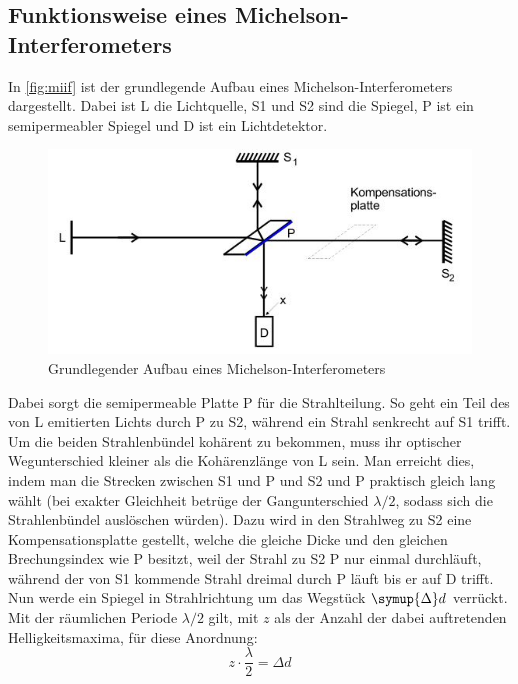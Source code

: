 \subsection{Funktionsweise eines Michelson-Interferometers} 
In \autoref{fig:miif} ist der grundlegende Aufbau eines Michelson-Interferometers dargestellt. Dabei ist L die Lichtquelle, S1 und S2 sind die Spiegel, P ist ein semipermeabler Spiegel und D ist ein Lichtdetektor. 
\begin{figure}[H]
    \centering
    \includegraphics[width=\textwidth]{graphics/miif.JPG}
    \caption{Grundlegender Aufbau eines Michelson-Interferometers \cite{anleitung}}
    \label{fig:miif}
    \end{figure}
    \noindent
Dabei sorgt die semipermeable Platte P für die Strahlteilung. So geht ein Teil des von L emitierten Lichts durch P zu S2, während ein Strahl senkrecht auf S1 trifft. Um die beiden Strahlenbündel kohärent zu bekommen, muss ihr optischer Wegunterschied kleiner als die Kohärenzlänge von L sein. Man erreicht dies, indem man die Strecken zwischen S1 und P und S2 und P praktisch gleich lang wählt (bei exakter Gleichheit betrüge der Gangunterschied $\lambda/2$, sodass sich die Strahlenbündel auslöschen würden). Dazu wird in den Strahlweg zu S2 eine Kompensationsplatte gestellt, welche die gleiche Dicke und den gleichen Brechungsindex wie P besitzt, weil der Strahl zu S2 P nur einmal durchläuft, während der von S1 kommende Strahl dreimal durch P läuft bis er auf D trifft.
Nun werde ein Spiegel in Strahlrichtung um das Wegstück $\symup{\Delta} d$ verrückt. Mit der räumlichen Periode $\lambda/2$ gilt, mit $z$ als der Anzahl der dabei auftretenden Helligkeitsmaxima, für diese Anordnung:
\begin{equation}
    \label{eqn:Wlaenge}
    z \cdot \frac{\lambda}{2} = \Delta d
\end{equation}


